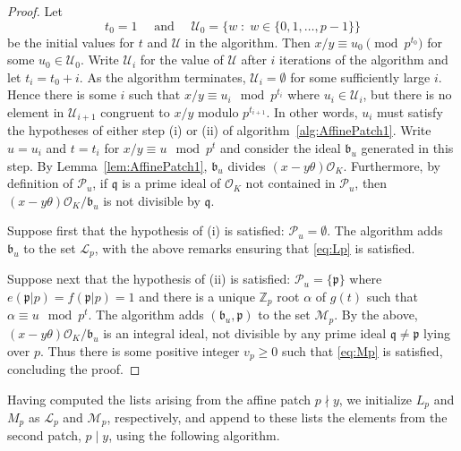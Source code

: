 \documentclass[11pt]{report}
\theoremstyle{definition}
\begin{document}
\begin{proof}
Let
\[t_0 = 1 \quad \text{ and } \quad \mathcal{U}_0=\{w \; :\;  w \in \{0,1,\dots,p-1\}\}\]
be the initial values for $t$ and $\mathcal{U}$ in the algorithm. Then $x/y \equiv u_0 \pmod{p^{t_0}}$ for some $u_0 \in \mathcal{U}_0$. Write $\mathcal{U}_i$ for the value of $\mathcal{U}$ after $i$ iterations of the algorithm  and let $t_i=t_0+i$. As the algorithm terminates, $\mathcal{U}_i = \emptyset$ for some sufficiently large $i$. Hence there is some $i$ such that $x/y \equiv u_i \mod{p^{t_i}}$ where $u_i \in \mathcal{U}_i$, but there is no element in $\mathcal{U}_{i+1}$ congruent to $x/y$ modulo $p^{t_{i+1}}$. In other words, $u_i$ must satisfy the hypotheses of either step (i) or (ii) of algorithm~\ref{alg:AffinePatch1}. Write $u=u_i$ and $t=t_i$ for $x/y \equiv u \mod{p^t}$ and consider the ideal $\mathfrak{b}_u$ generated in this step. By Lemma~\ref{lem:AffinePatch1}, $\mathfrak{b}_u$ divides $(x-y\theta) \mathcal{O}_K$. Furthermore, by definition of $\mathcal{P}_u$, if $\mathfrak{q}$ is a prime ideal of $\mathcal{O}_K$ not contained in $\mathcal{P}_u$, then $(x-y\theta)\mathcal{O}_K/\mathfrak{b}_u$ is not divisible by $\mathfrak{q}$.

Suppose first that the hypothesis of (i) is satisfied: $\mathcal{P}_u = \emptyset$. The algorithm adds $\mathfrak{b}_u$ to the set $\mathcal{L}_p$, with the above remarks ensuring that \eqref{eq:Lp} is satisfied.

Suppose next that the hypothesis of (ii) is satisfied: $\mathcal{P}_u=\{\mathfrak{p}\}$ where ${e(\mathfrak{p}|p)=f(\mathfrak{p}|p)=1}$ and there is a unique $\mathbb{Z}_p$ root $\alpha$ of $g(t)$ such that $\alpha \equiv u \mod{p^t}$. The algorithm adds $(\mathfrak{b}_u,\mathfrak{p})$ to the set $\mathcal{M}_p$. By the above, $(x-y\theta)\mathcal{O}_K/\mathfrak{b}_u$ is an integral ideal, not divisible by any prime ideal $\mathfrak{q} \neq \mathfrak{p}$ lying over $p$. Thus there is some positive integer $v_p \geq 0$ such that \eqref{eq:Mp} is satisfied, concluding the proof.
\end{proof}

Having computed the lists arising from the affine patch $p \nmid y$, we initialize $L_p$ and $M_p$ as $\mathcal{L}_p$ and $\mathcal{M}_p$, respectively, and append to these lists the elements from the second patch, $p \mid y$, using the following algorithm.
\end{document}
